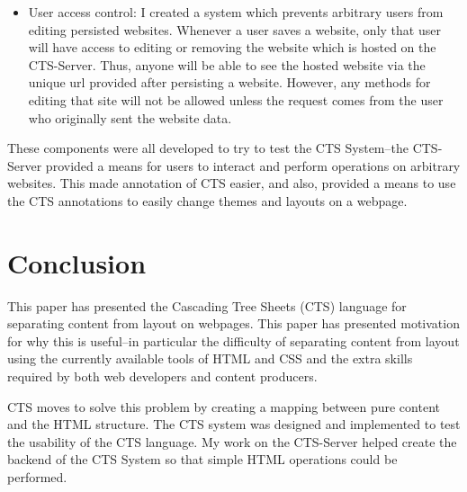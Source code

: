 \documentclass[12pt]{article}
\begin{document}
\begin{itemize}
  \item User access control: I created a system which prevents arbitrary users from editing persisted websites. Whenever a user saves a website, only that user will have access to editing or removing the website which is hosted on the CTS-Server. Thus, anyone will be able to see the hosted website via the unique url provided after persisting a website. However, any methods for editing that site will not be allowed unless the request comes from the user who originally sent the website data.
\end{itemize}

These components were all developed to try to test the CTS System--the CTS-Server provided a means for users to interact and perform operations on arbitrary websites. This made annotation of CTS easier, and also, provided a means to use the CTS annotations to easily change themes and layouts on a webpage.

\section{Conclusion}

This paper has presented the Cascading Tree Sheets (CTS) language for separating content from layout on webpages. This paper has presented motivation for why this is useful--in particular the difficulty of separating content from layout using the currently available tools of HTML and CSS and the extra skills required by both web developers and content producers.

CTS moves to solve this problem by creating a mapping between pure content and the HTML structure. The CTS system was designed and implemented to test the usability of the CTS language. My work on the CTS-Server helped create the backend of the CTS System so that simple HTML operations could be performed.
\end{document}
